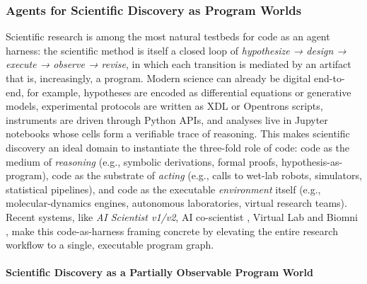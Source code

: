 \subsubsection{Agents for Scientific Discovery as Program Worlds}

Scientific research is among the most natural testbeds for code as an agent harness: the scientific method is itself a closed loop of \textit{hypothesize → design → execute → observe → revise}, in which each transition is mediated by an artifact that is, increasingly, a program. Modern science can already be digital end-to-end, for example, hypotheses are encoded as differential equations or generative models, experimental protocols are written as XDL or Opentrons scripts, instruments are driven through Python APIs, and analyses live in Jupyter notebooks whose cells form a verifiable trace of reasoning. This makes scientific discovery an ideal domain to instantiate the three-fold role of code: code as the medium of \textit{reasoning} (e.g., symbolic derivations, formal proofs, hypothesis-as-program), code as the substrate of \textit{acting} (e.g., calls to wet-lab robots, simulators, statistical pipelines), and code as the executable \textit{environment} itself (e.g., molecular-dynamics engines, autonomous laboratories, virtual research teams). Recent systems, like \textit{AI Scientist v1/v2}, \citep{lu2024aiscientistfullyautomated,yamada2025aiscientistv2workshoplevelautomated} AI co-scientist \citep{gottweis2025aicoscientist}, Virtual Lab \citep{swanson2025virtual} and Biomni \citep{huang2025biomni}, make this code-as-harness framing concrete by elevating the entire research workflow to a single, executable program graph.

\paragraph{Scientific Discovery as a Partially Observable Program World}

